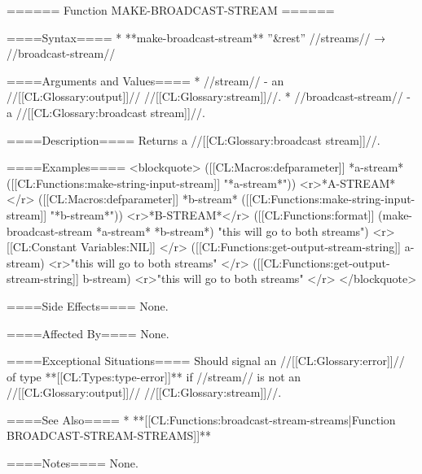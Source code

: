 ====== Function MAKE-BROADCAST-STREAM ======

====Syntax====
  * **make-broadcast-stream** ''&rest'' //streams// → //broadcast-stream//

====Arguments and Values====
  * //stream// - an //[[CL:Glossary:output]]// //[[CL:Glossary:stream]]//.
  * //broadcast-stream// - a //[[CL:Glossary:broadcast stream]]//.

====Description====
Returns a //[[CL:Glossary:broadcast stream]]//.

====Examples====
<blockquote> 
([[CL:Macros:defparameter]] *a-stream* ([[CL:Functions:make-string-input-stream]] "*a-stream*")) <r>*A-STREAM* </r>
([[CL:Macros:defparameter]] *b-stream* ([[CL:Functions:make-string-input-stream]] "*b-stream*")) <r>*B-STREAM*</r>
([[CL:Functions:format]] (make-broadcast-stream *a-stream* *b-stream*) "this will go to both streams") <r>[[CL:Constant Variables:NIL]] </r>
([[CL:Functions:get-output-stream-string]] a-stream) <r>"this will go to both streams" </r>
([[CL:Functions:get-output-stream-string]] b-stream) <r>"this will go to both streams" </r>
</blockquote>

====Side Effects====
None.


====Affected By====
None.

====Exceptional Situations====
Should signal an //[[CL:Glossary:error]]// of type **[[CL:Types:type-error]]** if //stream// is not an //[[CL:Glossary:output]]// //[[CL:Glossary:stream]]//.

====See Also====
  * **[[CL:Functions:broadcast-stream-streams|Function BROADCAST-STREAM-STREAMS]]**

====Notes====
None.

